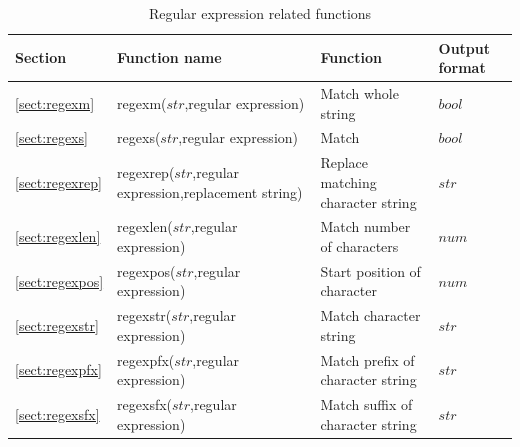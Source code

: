 \begin{table}[!hb]
\begin{center}
\caption{Regular expression related functions \label{tbl:mcal_regex}}
{\small
  \begin{tabular}{l|l|l|l} \hline
Section&Function name&Function&Output format\\ \hline

\ref{sect:regexm}& regexm($str$,regular expression)&
Match whole string&
$bool$\\

\ref{sect:regexs}& regexs($str$,regular expression)&
Match&
$bool$\\


\ref{sect:regexrep}& regexrep($str$,regular expression,replacement string)&
Replace matching character string &$str$\\

\ref{sect:regexlen}& regexlen($str$,regular expression)&
Match number of characters&
$num$\\

\ref{sect:regexpos}& regexpos($str$,regular expression)&
Start position of character&
$num$\\

\ref{sect:regexstr}& regexstr($str$,regular expression)&
Match character string&
$str$\\

\ref{sect:regexpfx}& regexpfx($str$,regular expression)&
Match prefix of character string&
$str$\\

\ref{sect:regexsfx}& regexsfx($str$,regular expression)&
Match suffix of character string &
$str$\\
 
\hline
  \end{tabular}
  }
  \end{center}
\end{table}


